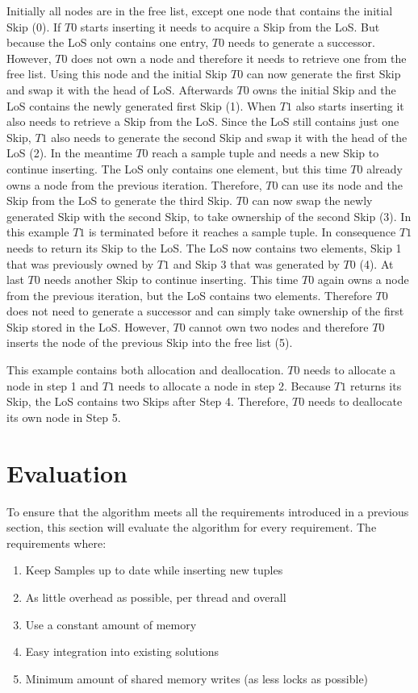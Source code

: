 \documentclass[sigconf,nonacm]{acmart}
\begin{document}
        Initially all nodes are in the free list, except one node that contains the initial Skip (0). If $T0$ starts inserting it needs to acquire a Skip from the LoS. But because the LoS only contains one entry, $T0$ needs to generate a successor. However, $T0$ does not own a node and therefore it needs to retrieve one from the free list. Using this node and the initial Skip $T0$ can now generate the first Skip and swap it with the head of LoS. Afterwards $T0$ owns the initial Skip and the LoS contains the newly generated first Skip (1). When $T1$ also starts inserting it also needs to retrieve a Skip from the LoS. Since the LoS still contains just one Skip, $T1$ also needs to generate the second Skip and swap it with the head of the LoS (2). In the meantime $T0$ reach a sample tuple and needs a new Skip to continue inserting. The LoS only contains one element, but this time $T0$ already owns a node from the previous iteration. Therefore, $T0$ can use its node and the Skip from the LoS to generate the third Skip. $T0$ can now swap the newly generated Skip with the second Skip, to take ownership of the second Skip (3). In this example $T1$ is terminated before it reaches a sample tuple. In consequence $T1$ needs to return its Skip to the LoS. The LoS now contains two elements, Skip 1 that was previously owned by $T1$ and Skip 3 that was generated by $T0$ (4). At last $T0$ needs another Skip to continue inserting. This time $T0$ again owns a node from the previous iteration, but the LoS contains two elements. Therefore $T0$ does not need to generate a successor and can simply take ownership of the first Skip stored in the LoS. However, $T0$ cannot own two nodes and therefore $T0$ inserts the node of the previous Skip into the free list (5).

        This example contains both allocation and deallocation. $T0$ needs to allocate a node in step 1 and $T1$ needs to allocate a node in step 2. Because $T1$ returns its Skip, the LoS contains two Skips after Step 4. Therefore, $T0$ needs to deallocate its own node in Step 5.


    \section{Evaluation}
        To ensure that the algorithm meets all the requirements introduced in a previous section, this section will evaluate the algorithm for every requirement. The requirements where:
        \begin{enumerate}
            \item Keep Samples up to date while inserting new tuples
            \item As little overhead as possible, per thread and overall
            \item Use a constant amount of memory
            \item Easy integration into existing solutions
            \item Minimum amount of shared memory writes (as less locks as possible)
        \end{enumerate}
\end{document}

